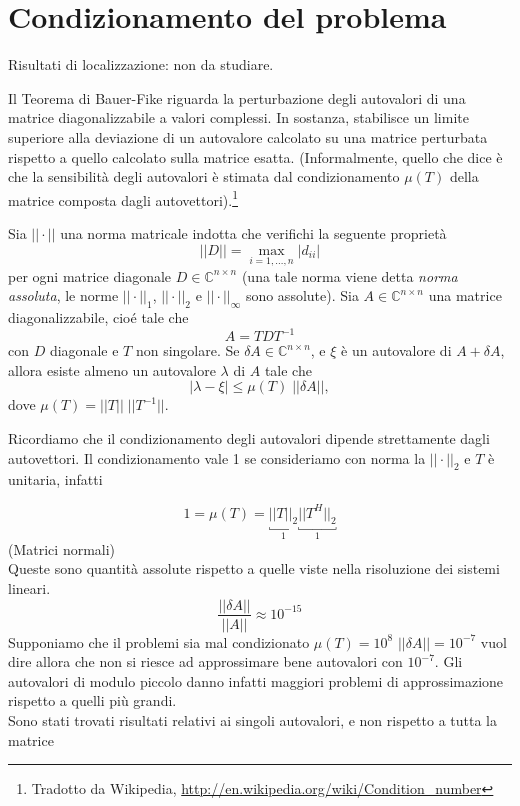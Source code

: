 \section{Condizionamento del problema}
\begin{notes}
Risultati di localizzazione: non da studiare.
\end{notes}
Il Teorema di Bauer-Fike riguarda la perturbazione degli autovalori di una matrice diagonalizzabile a valori complessi. In sostanza, stabilisce un limite superiore alla deviazione di un autovalore calcolato su una matrice perturbata rispetto a quello calcolato sulla matrice esatta. (Informalmente, quello che dice è che la sensibilità degli autovalori è stimata dal condizionamento $\mu(T)$ della matrice composta dagli autovettori).\footnote{Tradotto da Wikipedia, \url{http://en.wikipedia.org/wiki/Condition_number}} 

\begin{theo}
 Sia $ || \cdot ||$ una norma matricale indotta che verifichi la seguente
 propriet\`a
 $$ || D || = \displaystyle \max_{i=1, \ldots, n} |d_{ii}|$$
per ogni matrice diagonale $D \in \mathbb{C}^{n \times n}$
 (una tale norma viene detta \emph{norma assoluta},
 le norme $||\cdot||_{1}$, $ || \cdot ||_{2}$ e $|| \cdot ||_{\infty}  $
sono assolute). Sia $A \in \mathbb{C}^{n \times n}$
 una matrice diagonalizzabile, cio\'e tale che
 $$ A = TDT^{-1}$$
con $D$ diagonale e $T$ non singolare. 
Se $\delta A \in \mathbb{C}^{n \times n}$,
 e $\xi$ \`e  un autovalore di
$A + \delta A$, allora esiste almeno un autovalore $\lambda$ di $A$ tale che
$$ | \lambda - \xi | \leq \mu(T) \; || \delta A||,$$
dove $\mu(T) = ||T|| \; ||T^{-1}||$.
\end{theo}

Ricordiamo che il condizionamento degli autovalori dipende strettamente dagli autovettori.
Il condizionamento vale 1 se consideriamo con norma la $|| \cdot ||_2$ e $T$ \`e unitaria, infatti

$$ 1 = \mu(T) = \underbracket{||T||_{2}}_{1} \underbracket{||T^{H}||_{2}}_{1}$$
(Matrici normali) \\
Queste sono quantit\`a assolute rispetto a quelle viste nella risoluzione dei sistemi lineari.
$$
\dfrac{||\delta A||}{||A||} \approx 10^{-15}
$$
Supponiamo che il problemi sia mal condizionato
$\mu(T) = 10^8$ $||\delta A || =10^{-7}$
vuol dire allora che non si riesce ad approssimare bene
autovalori con $10^{-7}$. Gli autovalori di modulo
 piccolo danno infatti maggiori problemi di approssimazione
rispetto a quelli pi\`u grandi.  \\
Sono stati trovati risultati relativi ai singoli autovalori,
e non rispetto a tutta la matrice

